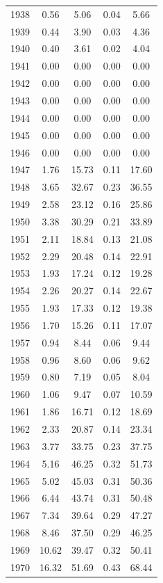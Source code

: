 \documentclass[12pt,]{article}
\begin{document}
\begin{longtable}{ccccc}
  1938 & 0.56 & 5.06 & 0.04 & 5.66 \\ 
  1939 & 0.44 & 3.90 & 0.03 & 4.36 \\ 
  1940 & 0.40 & 3.61 & 0.02 & 4.04 \\ 
  1941 & 0.00 & 0.00 & 0.00 & 0.00 \\ 
  1942 & 0.00 & 0.00 & 0.00 & 0.00 \\ 
  1943 & 0.00 & 0.00 & 0.00 & 0.00 \\ 
  1944 & 0.00 & 0.00 & 0.00 & 0.00 \\ 
  1945 & 0.00 & 0.00 & 0.00 & 0.00 \\ 
  1946 & 0.00 & 0.00 & 0.00 & 0.00 \\ 
  1947 & 1.76 & 15.73 & 0.11 & 17.60 \\ 
  1948 & 3.65 & 32.67 & 0.23 & 36.55 \\ 
  1949 & 2.58 & 23.12 & 0.16 & 25.86 \\ 
  1950 & 3.38 & 30.29 & 0.21 & 33.89 \\ 
  1951 & 2.11 & 18.84 & 0.13 & 21.08 \\ 
  1952 & 2.29 & 20.48 & 0.14 & 22.91 \\ 
  1953 & 1.93 & 17.24 & 0.12 & 19.28 \\ 
  1954 & 2.26 & 20.27 & 0.14 & 22.67 \\ 
  1955 & 1.93 & 17.33 & 0.12 & 19.38 \\ 
  1956 & 1.70 & 15.26 & 0.11 & 17.07 \\ 
  1957 & 0.94 & 8.44 & 0.06 & 9.44 \\ 
  1958 & 0.96 & 8.60 & 0.06 & 9.62 \\ 
  1959 & 0.80 & 7.19 & 0.05 & 8.04 \\ 
  1960 & 1.06 & 9.47 & 0.07 & 10.59 \\ 
  1961 & 1.86 & 16.71 & 0.12 & 18.69 \\ 
  1962 & 2.33 & 20.87 & 0.14 & 23.34 \\ 
  1963 & 3.77 & 33.75 & 0.23 & 37.75 \\ 
  1964 & 5.16 & 46.25 & 0.32 & 51.73 \\ 
  1965 & 5.02 & 45.03 & 0.31 & 50.36 \\ 
  1966 & 6.44 & 43.74 & 0.31 & 50.48 \\ 
  1967 & 7.34 & 39.64 & 0.29 & 47.27 \\ 
  1968 & 8.46 & 37.50 & 0.29 & 46.25 \\ 
  1969 & 10.62 & 39.47 & 0.32 & 50.41 \\ 
  1970 & 16.32 & 51.69 & 0.43 & 68.44 \\ 

\end{longtable}
\end{document}

